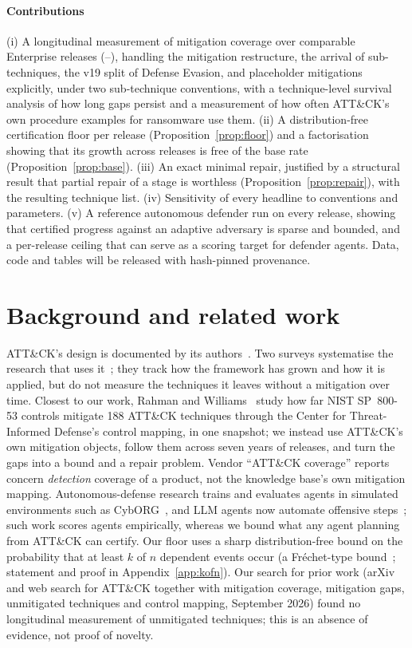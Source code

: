 \documentclass[conference,compsoc]{IEEEtran}
\begin{document}
\paragraph{Contributions} (i) A longitudinal measurement of mitigation coverage over
\GapComparable{} comparable Enterprise releases (\GapFirstDate--\GapLastDate), handling
the mitigation restructure, the arrival of sub-techniques, the v19 split of Defense
Evasion, and placeholder mitigations explicitly, under two sub-technique conventions,
with a technique-level survival analysis of how long gaps persist and a measurement of
how often ATT\&CK's own procedure examples for ransomware use them. (ii) A distribution-free certification floor per release
(Proposition~\ref{prop:floor}) and a factorisation showing that its growth across
releases is free of the base rate (Proposition~\ref{prop:base}). (iii) An exact minimal
repair, justified by a structural result that partial repair of a stage is worthless
(Proposition~\ref{prop:repair}), with the resulting technique list. (iv) Sensitivity of
every headline to conventions and parameters. (v) A reference autonomous defender run
on every release, showing that certified progress against an adaptive adversary is
sparse and bounded, and a per-release ceiling that can serve as a scoring target for
defender agents. Data, code and tables will be released with hash-pinned provenance.

\section{Background and related work}
ATT\&CK's design is documented by its authors~\cite{strom2018}. Two surveys systematise
the research that uses it~\cite{roy2023sok,alsada2024}; they track how the framework has
grown and how it is applied, but do not measure the techniques it leaves without a
mitigation over time. Closest to our work, Rahman and Williams~\cite{rahman2022} study
how far NIST SP~800-53 controls mitigate 188 ATT\&CK techniques through the Center for
Threat-Informed Defense's control mapping, in one snapshot; we instead use ATT\&CK's own
mitigation objects, follow them across seven years of releases, and turn the gaps into a
bound and a repair problem. Vendor ``ATT\&CK coverage'' reports concern \emph{detection}
coverage of a product, not the knowledge base's own mitigation mapping. Autonomous-defense
research trains and evaluates agents in simulated environments such as
CybORG~\cite{standen2021cyborg}, and LLM agents now automate offensive
steps~\cite{deng2024pentestgpt}; such work scores agents empirically, whereas we bound
what any agent planning from ATT\&CK can certify. Our floor uses a sharp
distribution-free bound on the probability that at least $k$ of $n$ dependent events
occur (a Fr\'echet-type bound~\cite{ruschendorf1991}; statement and proof in
Appendix~\ref{app:kofn}). Our search for prior work (arXiv and
web search for ATT\&CK together with mitigation coverage, mitigation gaps, unmitigated
techniques and control mapping, September 2026) found no longitudinal measurement of
unmitigated techniques; this is an absence of evidence, not proof of novelty.
\end{document}
